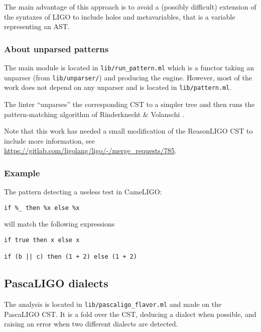 \documentclass[10pt,a4paper]{article}
\begin{document}
The main advantage of this approach is to avoid a (possibly difficult)
extension of the syntaxes of LIGO to include holes and metavariables,
that is a variable representing an AST.

\subsubsection{About unparsed patterns}

The main module is located in \verb|lib/run_pattern.ml| which is a
functor taking an unparser (from \verb|lib/unparser/|) and producing
the engine. However, most of the work does not depend on any unparser
and is located in \verb|lib/pattern.ml|.

The linter ``unparses'' the corresponding CST to a simpler tree and
then runs the pattern-matching algorithm of Rinderknecht \& Volanschi
\cite{unparsedpatterns}.

Note that this work has needed a small modification of the ReasonLIGO
CST to include more information, see
\url{https://gitlab.com/ligolang/ligo/-/merge_requests/785}.

\subsubsection{Example}
The pattern detecting a useless test in CameLIGO:
\begin{verbatim}
if %_ then %x else %x
\end{verbatim}

will match the following expressions
\begin{verbatim}
if true then x else x

if (b || c) then (1 + 2) else (1 + 2)
\end{verbatim}


\subsection{PascaLIGO dialects}
The analysis is located in \verb|lib/pascaligo_flavor.ml| and made on
the PascaLIGO CST. It is a fold over the CST, deducing a dialect when
possible, and raising an error when two different dialects are
detected.
\end{document}
